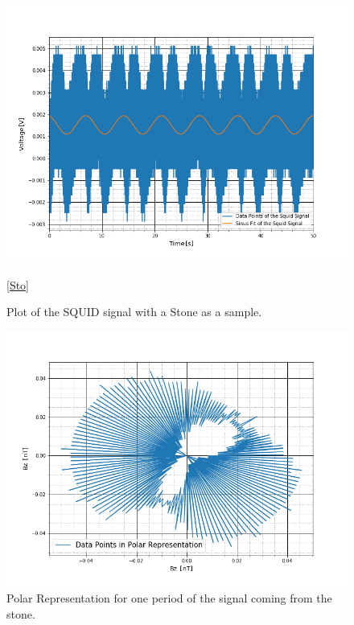 \begin{figure}[ht]
	\includegraphics[scale=0.5]{Bild/P4_4}
	\centering
	\caption[SQUID signal of Stone 4]{Plot of the SQUID signal with a Stone as a sample.}
	\ref{Sto}
\end{figure}
\begin{figure}[ht]
	\includegraphics[scale=0.5]{Bild/Stein}
	\centering
	\caption[Polar Representation for a Stone]{Polar Representation for one period of the signal coming from the stone.}
\end{figure}
